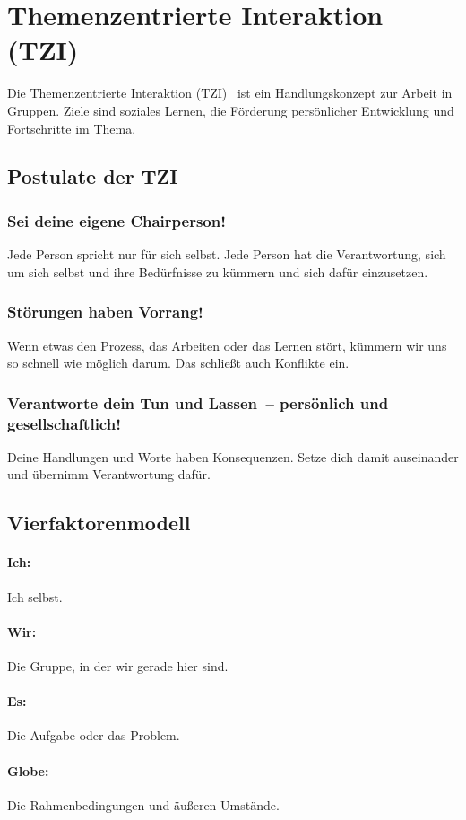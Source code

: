 \section{Themenzentrierte Interaktion (TZI)}
\label{tzi}

Die Themenzentrierte Interaktion (TZI)~\cite{tzi-reiser} ist ein Handlungskonzept zur Arbeit in Gruppen. Ziele sind soziales Lernen, die Förderung persönlicher Entwicklung und Fortschritte im Thema.


\subsection{Postulate der TZI}

\subsubsection{Sei deine eigene Chairperson!}

Jede Person spricht nur für sich selbst. Jede Person hat die Verantwortung, sich um sich selbst und ihre Bedürfnisse zu kümmern und sich dafür einzusetzen.

\subsubsection{Störungen haben Vorrang!}

Wenn etwas den Prozess, das Arbeiten oder das Lernen stört, kümmern wir uns so schnell wie möglich darum. Das schließt auch Konflikte ein.

\subsubsection{Verantworte dein Tun und Lassen~-- persönlich und gesellschaftlich!}

Deine Handlungen und Worte haben Konsequenzen. Setze dich damit auseinander und übernimm Verantwortung dafür.


\subsection{Vierfaktorenmodell}

\paragraph{Ich:} Ich selbst.

\paragraph{Wir:} Die Gruppe, in der wir gerade hier sind.

\paragraph{Es:} Die Aufgabe oder das Problem.

\paragraph{Globe:} Die Rahmenbedingungen und äußeren Umstände.
